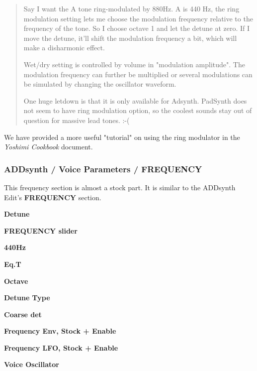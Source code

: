    \begin{quotation}
      Say I want the A tone ring-modulated by 880Hz. A is 440 Hz, the ring
      modulation setting lets me choose the modulation frequency relative
      to the frequency of the tone. So I choose octave 1 and let the
      detune at zero. If I move the detune, it'll shift the modulation
      frequency a bit, which will make a disharmonic effect.

      Wet/dry setting is controlled by volume in "modulation amplitude".
      The modulation frequency can further be multiplied or several
      modulations can be simulated by changing the oscillator waveform.

      One huge letdown is that it is only available for Adsynth. PadSynth
      does not seem to have ring modulation option, so the coolest sounds
      stay out of question for massive lead tones. :-(
   \end{quotation}

   We have provided a more useful "tutorial" on using the ring modulator in the
   \textsl{Yoshimi Cookbook} \cite{cookbook} document.

\subsubsection{ADDsynth / Voice Parameters / FREQUENCY}
\label{subsubsec:addsynth_voice_parameters_frequency}

   This frequency section is almost a stock part.
   It is similar to the ADDsynth Edit's \textbf{FREQUENCY} section.

   \begin{enumber}
      \item \textbf{Detune}
      \item \textbf{FREQUENCY slider}
      \item \textbf{440Hz}          %
      \item \textbf{Eq.T}          %
      \item \textbf{Octave}
      \item \textbf{Detune Type}
      \item \textbf{Coarse det}
      \item \textbf{Frequency Env, Stock + Enable}
      \item \textbf{Frequency LFO, Stock + Enable}
      \item \textbf{Voice Oscillator}
   \end{enumber}

